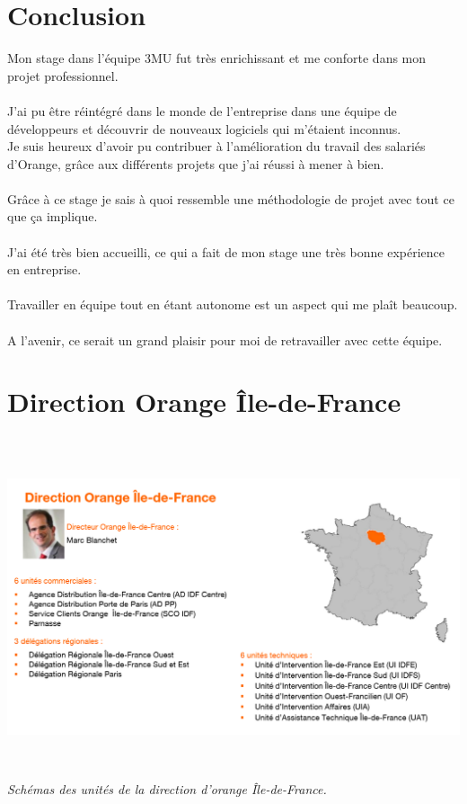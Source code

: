 \documentclass[a4paper,twoside,12pt]{report}
\begin{document}
\chapter{Conclusion}
Mon stage dans l’équipe 3MU fut très enrichissant et me conforte dans mon projet professionnel.\\\\
J’ai pu être réintégré dans le monde de l’entreprise dans une équipe de développeurs et découvrir de nouveaux logiciels qui m’étaient inconnus.\\
Je suis heureux d'avoir pu contribuer à l'amélioration du travail des salariés d'Orange, grâce aux différents projets que j'ai réussi à mener à bien.\\\\
Grâce à ce stage je sais à quoi ressemble une méthodologie de projet avec tout ce que ça implique.\\\\
J’ai été très bien accueilli, ce qui a fait de mon stage une très bonne expérience en entreprise.\\\\
Travailler en équipe tout en étant autonome est un aspect qui me plaît beaucoup.\\\\
A l'avenir, ce serait un grand plaisir pour moi de retravailler avec cette équipe.
\newpage
\appendix
\chapter{Direction Orange Île-de-France}
\begin{center}
\includegraphics[height=10cm]{direction.PNG}\\
\itshape Schémas des unités de la direction d'orange Île-de-France.
\end{center}
\end{document}
